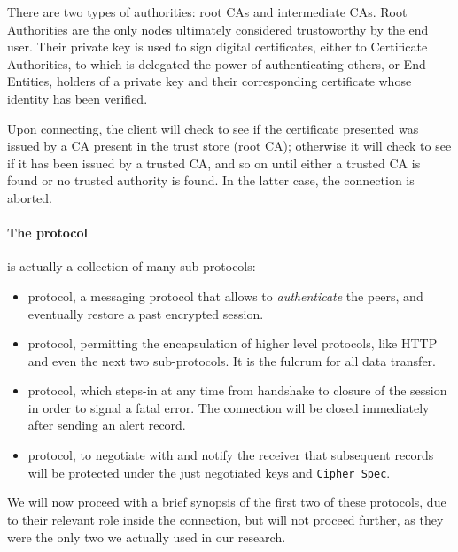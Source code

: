 There are two types of authorities: root CAs and intermediate CAs. Root
Authorities are the only nodes ultimately considered trustoworthy by the end
user. Their private key is used to sign digital certificates, either to
Certificate Authorities, to which is delegated the power of authenticating
others, or End Entities, holders of a private key and their corresponding
certificate whose identity has been verified.

Upon connecting, the client will check to see if the certificate presented was issued
by a CA present in the trust store (root CA); otherwise it will check to see if
it has been issued by a trusted CA, and so on until either a trusted CA is
found or no trusted authority is found. In the latter case, the connection is aborted.

\paragraph{The protocol} is actually a collection of many sub-protocols:
\begin{itemize}
  \setlength{\itemsep}{1pt}
  \setlength{\parskip}{0pt}
  \setlength{\parsep}{0pt}
\item {} protocol, a messaging protocol that allows to
  \emph{authenticate} the peers, and eventually restore a past encrypted
  session.
\item {} protocol, permitting the encapsulation of higher level protocols,
  like HTTP and even the next two sub-protocols. It is the fulcrum for all data
  transfer.
\item {} protocol, which steps-in at any time from handshake to closure of the
  session in order to signal a fatal error. The connection will be closed
  immediately after sending an alert record.
\item {} protocol, to negotiate with and notify  the receiver that
  subsequent records will be protected under the just negotiated keys and
  \texttt{Cipher Spec}.
\end{itemize}
We will now proceed with a brief synopsis of the first two of these protocols,
due to their relevant role inside the connection, but will not proceed further,
as they were the only two we actually used in our research.


